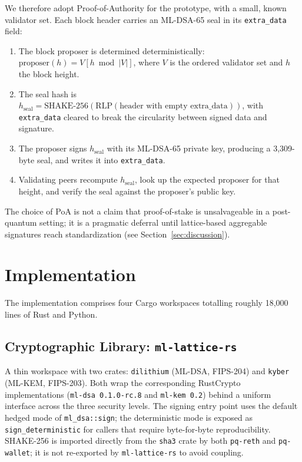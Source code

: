 \documentclass[journal,onecolumn,11pt]{IEEEtran}
\begin{document}
We therefore adopt Proof-of-Authority for the prototype, with a small, known validator set. Each block header carries an ML-DSA-65 seal in its \texttt{extra\_data} field:
\begin{enumerate}
  \item The block proposer is determined deterministically: $\text{proposer}(h) = V[h \bmod |V|]$, where $V$ is the ordered validator set and $h$ the block height.
  \item The seal hash is $h_{\text{seal}} = \mathrm{SHAKE\text{-}256}(\mathrm{RLP}(\text{header with empty extra\_data}))$, with \texttt{extra\_data} cleared to break the circularity between signed data and signature.
  \item The proposer signs $h_{\text{seal}}$ with its ML-DSA-65 private key, producing a 3{,}309-byte seal, and writes it into \texttt{extra\_data}.
  \item Validating peers recompute $h_{\text{seal}}$, look up the expected proposer for that height, and verify the seal against the proposer's public key.
\end{enumerate}
The choice of PoA is not a claim that proof-of-stake is unsalvageable in a post-quantum setting; it is a pragmatic deferral until lattice-based aggregable signatures reach standardization (see Section~\ref{sec:discussion}).

\section{Implementation}
\label{sec:impl}

The implementation comprises four Cargo workspaces totalling roughly 18{,}000 lines of Rust and Python.

\subsection{Cryptographic Library: \texttt{ml-lattice-rs}}

A thin workspace with two crates: \texttt{dilithium} (ML-DSA, FIPS-204) and \texttt{kyber} (ML-KEM, FIPS-203). Both wrap the corresponding RustCrypto implementations (\texttt{ml-dsa 0.1.0-rc.8} and \texttt{ml-kem 0.2}) behind a uniform interface across the three security levels. The signing entry point uses the default hedged mode of \texttt{ml\_dsa::sign}; the deterministic mode is exposed as \texttt{sign\_deterministic} for callers that require byte-for-byte reproducibility. SHAKE-256 is imported directly from the \texttt{sha3} crate by both \texttt{pq-reth} and \texttt{pq-wallet}; it is not re-exported by \texttt{ml-lattice-rs} to avoid coupling.
\end{document}
